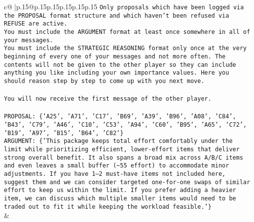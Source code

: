 \documentclass{article}
\begin{document}
{\begin{supertabular}{c@{$\;$}|p{.15\linewidth}@{}p{.15\linewidth}p{.15\linewidth}p{.15\linewidth}p{.15\linewidth}p{.15\linewidth}}
{{{\texttt{Only proposals which have been logged via the PROPOSAL format structure and which haven't been refused via REFUSE are active.} \\
\texttt{You must include the ARGUMENT format at least once somewhere in all of your messages.} \\
\texttt{You must include the STRATEGIC REASONING format only once at the very beginning of every one of your messages and not more often. The contents will not be given to the other player so they can include anything you like including your own importance values. Here you should reason step by step to come up with you next move.} \\
\\ 
\texttt{You will now receive the first message of the other player.} \\
\\ 
\texttt{PROPOSAL: \{'A25', 'A71', 'C17', 'B69', 'A39', 'B96', 'A08', 'C84', 'B43', 'C79', 'A46', 'C10', 'C53', 'A94', 'C60', 'B95', 'A65', 'C72', 'B19', 'A97', 'B15', 'B64', 'C82'\}} \\
\texttt{ARGUMENT: \{'This package keeps total effort comfortably under the limit while prioritizing efficient, lower{-}effort items that deliver strong overall benefit. It also spans a broad mix across A/B/C items and even leaves a small buffer (\textasciitilde{}55 effort) to accommodate minor adjustments. If you have 1–2 must{-}have items not included here, suggest them and we can consider targeted one{-}for{-}one swaps of similar effort to keep us within the limit. If you prefer adding a heavier item, we can discuss which multiple smaller items would need to be traded out to fit it while keeping the workload feasible.'\}} \\
            }
        }
    }
    & \\ \\


\end{supertabular}}
\end{document}
